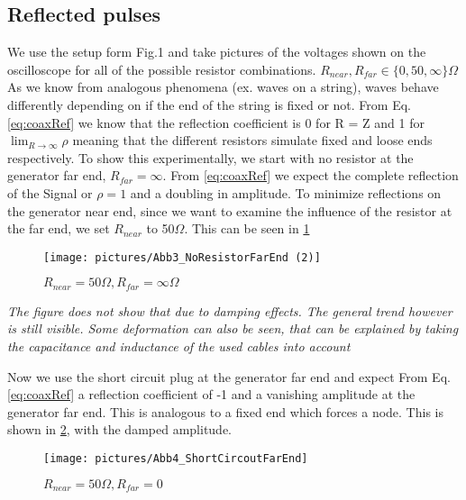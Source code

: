 \documentclass[a4paper,10pt,twocolumn]{article}
\begin{document}
    \subsection{Reflected pulses}\label{subsec:wave-impedance-in-the-coax}
    We use the setup form Fig.1 and take pictures of the voltages shown on the oscilloscope for all of the possible resistor combinations. $R_{near}, R_{far} \in \{ 0,50,\infty\} \Omega$
    As we know from analogous phenomena (ex. waves on a string), waves behave differently depending on if the end of the string is fixed or not.
    From Eq. \ref{eq:coaxRef} we know that the reflection coefficient is 0 for R = Z and 1 for $\lim_{R \to \infty}\rho$ meaning that the different resistors simulate fixed and loose ends respectively.
    To show this experimentally, we start with no resistor at the generator far end, $R_{far} = \infty$.
    From \ref{eq:coaxRef} we expect the complete reflection of the Signal or $\rho = 1$ and a doubling in amplitude.
    To minimize reflections on the generator near end, since we want to examine the influence of the resistor at the far end, we set $R_{near}$ to 50$\Omega$.
    This can be seen in \ref{fig:NoResistorFarEnd}
    \begin{figure}[htbp]                                 %
        \begin{center}                                       %
            \texttt{[image: pictures/Abb3\_NoResistorFarEnd (2)]}      %
            \caption[]{$R_{near}=50\Omega, R_{far} = \infty \Omega$}   %
            \label{fig:NoResistorFarEnd}                                      %
        \end{center}
    \end{figure}
    \textit{The figure does not show that due to damping effects. The general trend however is still visible. Some deformation can also be seen, that can be explained by taking the capacitance and inductance of the used cables into account}
    
    Now we use the short circuit plug at the generator far end and expect From Eq. \ref{eq:coaxRef} a reflection coefficient of -1 and a vanishing amplitude at the generator far end.
    This is analogous to a fixed end which forces a node.
    This is shown in \ref{fig:ShortCircuitFarEnd}, with the damped amplitude.
    \begin{figure}[htbp]                                 %
        \begin{center}                                       %
            \texttt{[image: pictures/Abb4\_ShortCircoutFarEnd]}      %
            \caption[]{$R_{near}=50\Omega,R_{far} = 0$}   %
            \label{fig:ShortCircuitFarEnd}                                      %
        \end{center}
    \end{figure}
    
\end{document}
